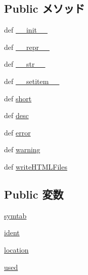 \subsection*{Public メソッド}
\begin{DoxyCompactItemize}
\item 
def \hyperlink{classslicc_1_1symbols_1_1Symbol_1_1Symbol_ac775ee34451fdfa742b318538164070e}{\_\-\_\-init\_\-\_\-}
\item 
def \hyperlink{classslicc_1_1symbols_1_1Symbol_1_1Symbol_ad8b9328939df072e4740cd9a63189744}{\_\-\_\-repr\_\-\_\-}
\item 
def \hyperlink{classslicc_1_1symbols_1_1Symbol_1_1Symbol_aa7a4b9bc0941308e362738503137460e}{\_\-\_\-str\_\-\_\-}
\item 
def \hyperlink{classslicc_1_1symbols_1_1Symbol_1_1Symbol_a09195b01147e970ca71c48b57f653940}{\_\-\_\-setitem\_\-\_\-}
\item 
def \hyperlink{classslicc_1_1symbols_1_1Symbol_1_1Symbol_a7c1284bafc28442baf652148e07f9ecd}{short}
\item 
def \hyperlink{classslicc_1_1symbols_1_1Symbol_1_1Symbol_a0a4b6f74007ab2b4de7aae39102732ea}{desc}
\item 
def \hyperlink{classslicc_1_1symbols_1_1Symbol_1_1Symbol_a3133d4a0dde10b6ebe257e3db716a3e0}{error}
\item 
def \hyperlink{classslicc_1_1symbols_1_1Symbol_1_1Symbol_ac1fc7cd7c75bbbeb7fcd0ada8bf86b81}{warning}
\item 
def \hyperlink{classslicc_1_1symbols_1_1Symbol_1_1Symbol_abc09a7197df5d7ef04e5cdfaa1139ead}{writeHTMLFiles}
\end{DoxyCompactItemize}
\subsection*{Public 変数}
\begin{DoxyCompactItemize}
\item 
\hyperlink{classslicc_1_1symbols_1_1Symbol_1_1Symbol_a643766e045eab208f01ba6957b661e2a}{symtab}
\item 
\hyperlink{classslicc_1_1symbols_1_1Symbol_1_1Symbol_a2fe57e2d3d2cba9a3aeba2f629eaa78b}{ident}
\item 
\hyperlink{classslicc_1_1symbols_1_1Symbol_1_1Symbol_a5f269c22e6d9d32b0b0ad7e6166854df}{location}
\item 
\hyperlink{classslicc_1_1symbols_1_1Symbol_1_1Symbol_ab896e794c7918f3e8a6ca0f8339f1add}{used}
\end{DoxyCompactItemize}


